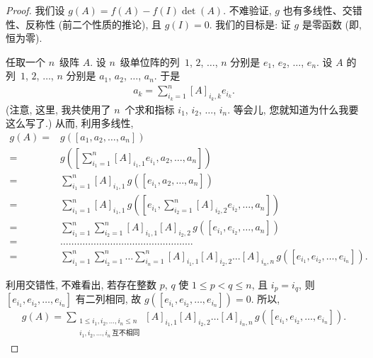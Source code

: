 \documentclass[%
    UTF8,%
    fontset=none,%
    punct=kaiming,%
    zihao=-4,%
    a4paper,%
    oneside,%
]{ctexbook}
\renewcommand*{\leq}{\leqslant}
\begin{document}
\begin{proof}
    我们设 \(g(A) = f(A) - f(I) \det {(A)}\).
    不难验证, \(g\) 也有多线性、交错性、反称性
    (前二个性质的推论),
    且 \(g(I) = 0\).
    我们的目标是: 证 \(g\) 是零函数 (即, 恒为零).

    任取一个 \(n\)~级阵 \(A\).
    设 \(n\)~级单位阵的列~\(1\), \(2\), \(\dots\), \(n\)
    分别是 \(e_1\), \(e_2\), \(\dots\), \(e_n\).
    设 \(A\) 的列~\(1\), \(2\), \(\dots\), \(n\)
    分别是 \(a_1\), \(a_2\), \(\dots\), \(a_n\).
    于是
    \begin{align*}
        a_{k}
        = \sum_{i_k = 1}^{n} {[A]_{i_k,k} e_{i_k}}.
    \end{align*}
    (注意, 这里, 我共使用了 \(n\)~个求和指标
    \(i_1\), \(i_2\), \(\dots\), \(i_n\).
    等会儿, 您就知道为什么我要这么写了.)
    从而, 利用多线性,
    \begin{align*}
        g(A)
        = {} &
        g([a_1, a_2, \dots, a_n])
        \\
        = {} &
        g\left(\left[ \sum_{i_1 = 1}^{n} {[A]_{i_1,1} e_{i_1},
        a_2, \dots, a_n} \right]\right)
        \\
        = {} &
        \sum_{i_1 = 1}^{n} {[A]_{i_1,1}\,
        g([ e_{i_1}, a_2, \dots, a_n ])}
        \\
        = {} &
        \sum_{i_1 = 1}^{n} {[A]_{i_1,1}\,
        g\left(\left[ e_{i_1},
            \sum_{i_2 = 1}^{n} [A]_{i_2,2} e_{i_2},
        \dots, a_n
        \right]\right)}
        \\
        = {} &
        \sum_{i_1 = 1}^{n} {
        \sum_{i_2 = 1}^{n} {[A]_{i_1,1} [A]_{i_2,2}\,
        g([ e_{i_1}, e_{i_2}, \dots, a_n ])}}
        \\
        = {} &
        \dots \dots \dots \dots
        \dots \dots \dots \dots
        \dots \dots \dots \dots
        \dots \dots \dots \dots
        \\
        = {} &
        \sum_{i_1 = 1}^{n} {
        \sum_{i_2 = 1}^{n} {
        \dots
        \sum_{i_n = 1}^{n} {
        [A]_{i_1,1} [A]_{i_2,2} \dots [A]_{i_n,n} \,
        g([e_{i_1}, e_{i_2}, \dots, e_{i_n}])}}}.
    \end{align*}

    利用交错性, 不难看出,
    若存在整数 \(p\), \(q\)
    使 \(1 \leq p < q \leq n\),
    且 \(i_p = i_q\),
    则 \([e_{i_1}, e_{i_2}, \dots, e_{i_n}]\)
    有二列相同,
    故 \(g([e_{i_1}, e_{i_2}, \dots, e_{i_n}]) = 0\).
    所以,
    \begin{align*}
        g(A)
        = \sum_{\substack{
        1 \leq i_1, i_2, \dots, i_n \leq n \\
                i_1, i_2, \dots, i_n\,\text{互不相同}
            }}
        {[A]_{i_1,1} [A]_{i_2,2} \dots [A]_{i_n,n}\,
            g([e_{i_1}, e_{i_2}, \dots, e_{i_n}])}.
    \end{align*}


\end{proof}
\end{document}
